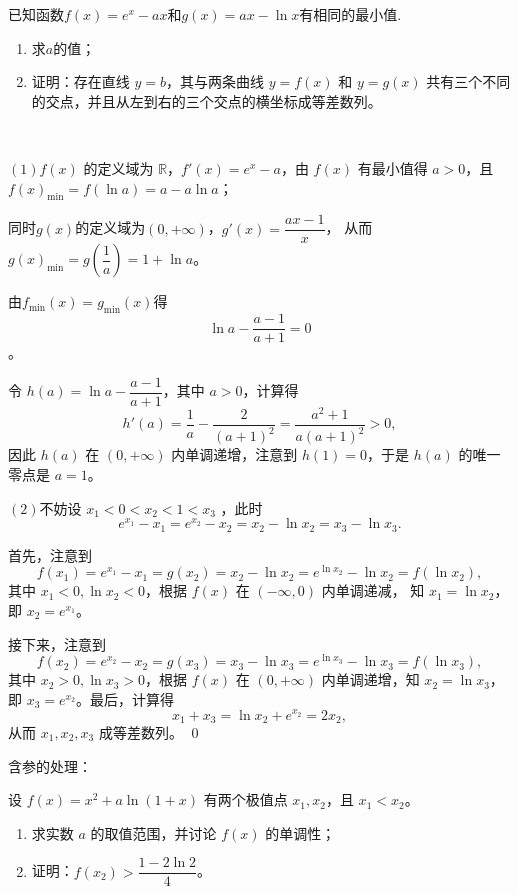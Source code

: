 \begin{example}[2022年新高考I卷]
    已知函数\(f(x)=e^x-ax\)和\(g(x)=ax-\ln x\)有相同的最小值.
    \begin{enumerate}
        \item 求\(a\)的值；
        \item 证明：存在直线 $y = b$，其与两条曲线 $y = f(x)$ 和 $y = g(x)$ 共有三个不同的交点，并且从左到右的三个交点的横坐标成等差数列。
    \end{enumerate}
\end{example}
\begin{jie}
\  

\((1)\)$f(x)$ 的定义域为 $\mathbb{R}$，$f'(x) = e^x - a$，由 $f(x)$ 有最小值得 $a > 0$，且 $f(x)_{\min} = f(\ln a) = a - a\ln a$；

同时\(g(x)\)的定义域为\((0,+\infty)\)，$g'(x) = \dfrac{ax - 1}{x}$，
从而 $g(x)_{\min} = g\left(\dfrac{1}{a}\right) = 1 + \ln a$。

由\(f_{\min}(x)=g_{\min}(x)\)得
$$ \ln a - \dfrac{a-1}{a+1} = 0$$。
            
        令 $h(a) = \ln a - \dfrac{a-1}{a+1}$，其中 $a > 0$，计算得
        \[ h'(a) = \frac{1}{a} - \frac{2}{(a+1)^2} = \frac{a^2 + 1}{a(a+1)^2} > 0, \]
        因此 $h(a)$ 在 $(0, +\infty)$ 内单调递增，注意到 $h(1) = 0$，于是 $h(a)$ 的唯一零点是 $a = 1$。
        
\((2)\)不妨设 $x_1 < 0 < x_2 < 1 < x_3$ ，此时
    \[e^{x_1} - x_1 = e^{x_2} - x_2 = x_2 - \ln x_2 = x_3 - \ln x_3. \]

    首先，注意到
        \[f(x_1) = e^{x_1} - x_1 = g(x_2) = x_2 - \ln x_2 = e^{\ln x_2} - \ln x_2 = f(\ln x_2),\]
    其中 $x_1 < 0, \ln x_2 < 0$，根据 $f(x)$ 在 $(-\infty, 0)$ 内单调递减，
    知 $x_1 = \ln x_2$，即 $x_2 = e^{x_1}$。
    
    接下来，注意到
    \[f(x_2) = e^{x_2} - x_2 = g(x_3) = x_3 - \ln x_3 = e^{\ln x_3} - \ln x_3 = f(\ln x_3),  \]
    其中 $x_2 > 0, \ln x_3 > 0$，根据 $f(x)$ 在 $(0, +\infty)$ 内单调递增，知 $x_2 = \ln x_3$，即 $x_3 = e^{x_2}$。最后，计算得
     \[x_1 + x_3 = \ln x_2 + e^{x_2} = 2x_2,\]
    从而 $x_1, x_2, x_3$ 成等差数列。
    \qed
\end{jie}



含参的处理：

\begin{example}[2009 全国 II 理 ]
    设 $f(x) = x^2 + a \ln(1 + x)$ 有两个极值点 $x_1, x_2$，且 $x_1 < x_2$。
\begin{enumerate}
    \item 求实数 $a$ 的取值范围，并讨论 $f(x)$ 的单调性；
    \item 证明：$f(x_2) > \dfrac{1 - 2\ln 2}{4}$。
\end{enumerate}
\end{example}

